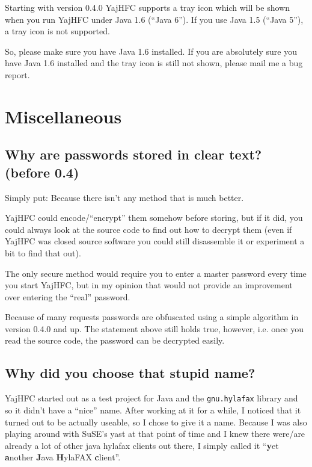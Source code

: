 \documentclass[a4paper,10pt]{scrartcl}
\begin{document}
Starting with version 0.4.0 YajHFC supports a tray icon which will be shown when you run YajHFC under Java 1.6 (``Java 6'').
If you use Java 1.5 (``Java 5''), a tray icon is not supported.

So, please make sure you have Java 1.6 installed. If you are absolutely sure you have Java 1.6 installed and the tray icon is still not shown, please mail me a bug report.


\section{Miscellaneous}

\subsection{Why are passwords stored in clear text? (before 0.4)}

Simply put: Because there isn't any method that is much better.

YajHFC could encode/``encrypt'' them somehow before storing, but if it did, 
you could always look at the source code to find out how to decrypt them
(even if YajHFC was closed source software you could still disassemble it
or experiment a bit to find that out).

The only secure method would require you to enter a master password every time
you start YajHFC, but in my opinion that would not provide an improvement over
entering the ``real'' password.

Because of many requests passwords are obfuscated using a simple algorithm in version 0.4.0 and up.
The statement above still holds true, however, i.e. once you read the source code, the password can be decrypted easily.

\subsection{Why did you choose that stupid name?}

YajHFC started out as a test project for Java and the \texttt{gnu.hylafax} library and so
it didn't have a ``nice'' name. After working at it for a while, I noticed that it turned 
out to be actually useable, so I chose to give it a name.
Because I was also playing around with SuSE's yast at that point of time and I knew there
were/are already a lot of other java hylafax clients out there, I simply called it
``\textbf{y}et \textbf{a}nother \textbf{J}ava \textbf{H}ylaFAX \textbf{c}lient''. 
\end{document}
